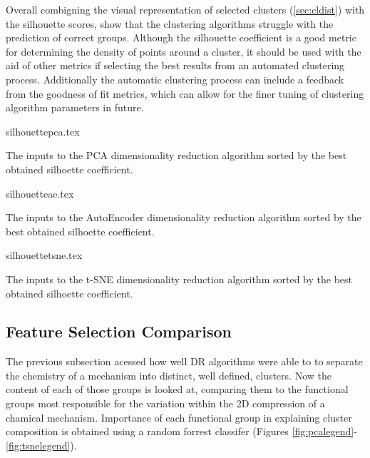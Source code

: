 Overall combigning the visual representation of selected clusters (\autoref{sec:cldist}) with the silhouette scores, show that the clustering algorithms struggle with the prediction of correct groups. Although the silhouette coefficient is a good metric for determining the density of points around a cluster, it should be used with the aid of other metrics if selecting the best results from an automated clustering process. Additionally the automatic clustering process can include a feedback from the goodness of fit metrics, which can allow for the finer tuning of clustering algorithm parameters in future.


\begin{table}[H]
    \centering
        {silhouettepca.tex}
        \caption{The inputs to the PCA dimensionality reduction algorithm sorted by the best obtained silhoette coefficient.  }
        \label{tab:pcasil}
\end{table}


\begin{table}[H]
    \centering
        {silhouetteae.tex}
        \caption{The inputs to the AutoEncoder dimensionality reduction algorithm sorted by the best obtained silhoette coefficient.  }
        \label{tab:aesil}
\end{table}

\begin{table}[H]
    \centering
        {silhouettetsne.tex}
        \caption{The inputs to the t-SNE dimensionality reduction algorithm sorted by the best obtained silhoette coefficient.  }
        \label{tab:tsnesil}
\end{table}









\subsection{Feature Selection Comparison}\label{sec:fsclust}

The previous subsection acessed how well DR algorithms were able to to  separate the chemistry of a mechanism into distinct, well defined, clusters. Now the content of each of those groups is looked at, comparing them to the  functional groups most responsible for the variation within the 2D compression of a chamical mechanism. Importance of each functional group in explaining cluster composition is obtained using a random forrest classifer (Figures \ref{fig:pcalegend}-\ref{fig:tsnelegend}).

